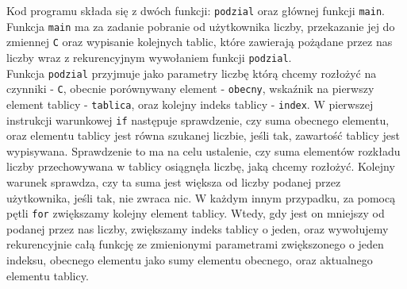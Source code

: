 \documentclass[UTF8]{article}
\begin{document}
Kod programu składa się z dwóch funkcji: \texttt{podzial} oraz głównej funkcji \texttt{main}. ~\\

Funkcja \texttt{main} ma za zadanie pobranie od użytkownika liczby, przekazanie jej do zmiennej \texttt{C} oraz wypisanie kolejnych tablic, które zawierają pożądane przez nas liczby wraz z rekurencyjnym wywołaniem funkcji \texttt{podzial}. ~\\

Funkcja \texttt{podzial} przyjmuje jako parametry liczbę którą chcemy rozłożyć na czynniki - \texttt{C}, obecnie porównywany element - \texttt{obecny}, wskaźnik na pierwszy element tablicy - \texttt{tablica}, oraz kolejny indeks tablicy - \texttt{index}. W pierwszej instrukcji warunkowej \texttt{if} następuje sprawdzenie, czy suma obecnego elementu, oraz elementu tablicy jest równa szukanej liczbie, jeśli tak, zawartość tablicy jest wypisywana. Sprawdzenie to ma na celu ustalenie, czy suma elementów rozkładu liczby przechowywana w tablicy osiągnęła liczbę, jaką chcemy rozłożyć. Kolejny warunek sprawdza, czy ta suma jest większa od liczby podanej przez użytkownika, jeśli tak, nie zwraca nic. W każdym innym przypadku, za pomocą pętli \texttt{for} zwiększamy kolejny element tablicy. Wtedy, gdy jest on mniejszy od podanej przez nas liczby, zwiększamy indeks tablicy o jeden, oraz wywołujemy rekurencyjnie całą funkcję ze zmienionymi parametrami zwiększonego o jeden indeksu, obecnego elementu jako sumy elementu obecnego, oraz aktualnego elementu tablicy.~
\end{document}
